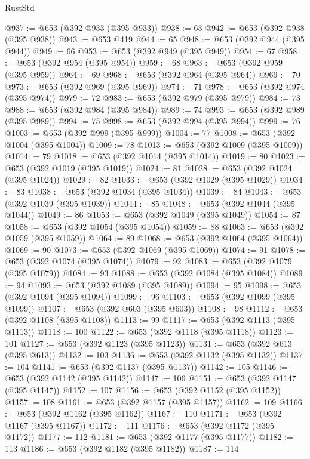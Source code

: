 \begin{lexlean}{RustStd}
\begin{coremodule}
{\begin{coremodule}
{{{{{{{{{{{{@937 := @653 (@392 @933 (@395 @933))
@938 := 63
@942 := @653 (@392 @938 (@395 @938))
@943 := @653 @419
@944 := 65
@948 := @653 (@392 @944 (@395 @944))
@949 := 66
@953 := @653 (@392 @949 (@395 @949))
@954 := 67
@958 := @653 (@392 @954 (@395 @954))
@959 := 68
@963 := @653 (@392 @959 (@395 @959))
@964 := 69
@968 := @653 (@392 @964 (@395 @964))
@969 := 70
@973 := @653 (@392 @969 (@395 @969))
@974 := 71
@978 := @653 (@392 @974 (@395 @974))
@979 := 72
@983 := @653 (@392 @979 (@395 @979))
@984 := 73
@988 := @653 (@392 @984 (@395 @984))
@989 := 74
@993 := @653 (@392 @989 (@395 @989))
@994 := 75
@998 := @653 (@392 @994 (@395 @994))
@999 := 76
@1003 := @653 (@392 @999 (@395 @999))
@1004 := 77
@1008 := @653 (@392 @1004 (@395 @1004))
@1009 := 78
@1013 := @653 (@392 @1009 (@395 @1009))
@1014 := 79
@1018 := @653 (@392 @1014 (@395 @1014))
@1019 := 80
@1023 := @653 (@392 @1019 (@395 @1019))
@1024 := 81
@1028 := @653 (@392 @1024 (@395 @1024))
@1029 := 82
@1033 := @653 (@392 @1029 (@395 @1029))
@1034 := 83
@1038 := @653 (@392 @1034 (@395 @1034))
@1039 := 84
@1043 := @653 (@392 @1039 (@395 @1039))
@1044 := 85
@1048 := @653 (@392 @1044 (@395 @1044))
@1049 := 86
@1053 := @653 (@392 @1049 (@395 @1049))
@1054 := 87
@1058 := @653 (@392 @1054 (@395 @1054))
@1059 := 88
@1063 := @653 (@392 @1059 (@395 @1059))
@1064 := 89
@1068 := @653 (@392 @1064 (@395 @1064))
@1069 := 90
@1073 := @653 (@392 @1069 (@395 @1069))
@1074 := 91
@1078 := @653 (@392 @1074 (@395 @1074))
@1079 := 92
@1083 := @653 (@392 @1079 (@395 @1079))
@1084 := 93
@1088 := @653 (@392 @1084 (@395 @1084))
@1089 := 94
@1093 := @653 (@392 @1089 (@395 @1089))
@1094 := 95
@1098 := @653 (@392 @1094 (@395 @1094))
@1099 := 96
@1103 := @653 (@392 @1099 (@395 @1099))
@1107 := @653 (@392 @603 (@395 @603))
@1108 := 98
@1112 := @653 (@392 @1108 (@395 @1108))
@1113 := 99
@1117 := @653 (@392 @1113 (@395 @1113))
@1118 := 100
@1122 := @653 (@392 @1118 (@395 @1118))
@1123 := 101
@1127 := @653 (@392 @1123 (@395 @1123))
@1131 := @653 (@392 @613 (@395 @613))
@1132 := 103
@1136 := @653 (@392 @1132 (@395 @1132))
@1137 := 104
@1141 := @653 (@392 @1137 (@395 @1137))
@1142 := 105
@1146 := @653 (@392 @1142 (@395 @1142))
@1147 := 106
@1151 := @653 (@392 @1147 (@395 @1147))
@1152 := 107
@1156 := @653 (@392 @1152 (@395 @1152))
@1157 := 108
@1161 := @653 (@392 @1157 (@395 @1157))
@1162 := 109
@1166 := @653 (@392 @1162 (@395 @1162))
@1167 := 110
@1171 := @653 (@392 @1167 (@395 @1167))
@1172 := 111
@1176 := @653 (@392 @1172 (@395 @1172))
@1177 := 112
@1181 := @653 (@392 @1177 (@395 @1177))
@1182 := 113
@1186 := @653 (@392 @1182 (@395 @1182))
@1187 := 114
}}}}}}}}}}}}
\end{coremodule}}
\end{coremodule}
\end{lexlean}
